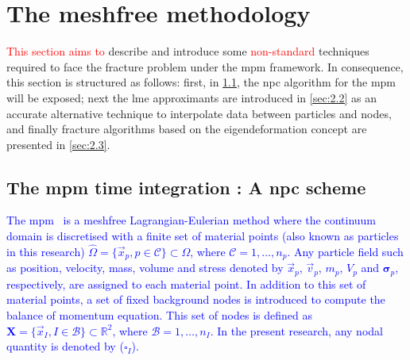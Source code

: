 \documentclass[preprint,12pt,a4paper]{elsarticle}
\newcommand{\tens}[1]{
  \ensuremath{\mathbf{{#1}}}
}
\begin{document}
\section{The meshfree methodology}
\label{sec:2}

\textcolor{red}{This section aims to} describe and introduce some \textcolor{red}{non-standard}
techniques required to face the fracture problem under the \acrshort{mpm}
framework. In consequence, this section is structured as follows: first, in
\ref{sec:2.1}, the \acrfull{npc} algorithm for the \acrshort{mpm}
will be exposed; next the \acrshort{lme} approximants are
introduced in \ref{sec:2.2} as an accurate alternative technique to
interpolate data between particles and nodes, and finally fracture
algorithms based on the eigendeformation concept are presented in
\ref{sec:2.3}.

\subsection{The \acrshort{mpm} time integration : A \acrlong{npc}  scheme}
\label{sec:2.1}

\textcolor{blue}{The \acrshort{mpm}~\cite{Sulsky1994} is a meshfree Lagrangian-Eulerian method where the continuum \gls{domain} is discretised with a finite set of material points (also known as particles in this research) $\hat{\Omega} = \{ \vec{x}_p, p \in \mathcal{C} \} \subset \Omega$, where $\mathcal{C} = 1, \ldots, n_p$. Any particle field such as position, velocity, mass, volume and stress denoted by $\vec{x}_p$, $\vec{v}_p$, $m_p$, $V_p$ and $\tens{\sigma}_p$, respectively, are assigned to each material point.  In addition to this set of material points, a set of fixed background nodes is introduced to compute the balance of momentum equation. This set of nodes is defined as  $\textbf{X} = \{ \vec{x}_I, I \in \mathcal{B} \} \subset \mathbb{R}^{2}$, where $\mathcal{B} = 1, \ldots, n_I$. In the present research, any nodal quantity is denoted by ($\square_I$).}
\end{document}

